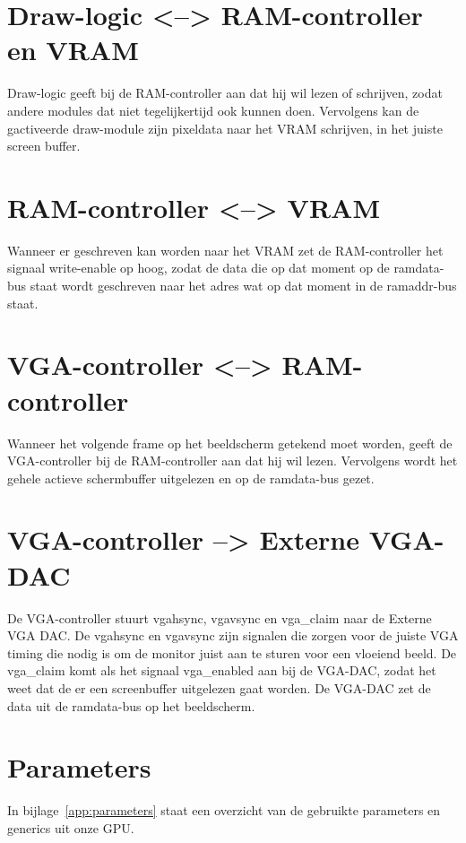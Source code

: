 \documentclass{scrartcl} %
\begin{document}
\section {Draw-logic <--> RAM-controller en VRAM}
Draw-logic geeft bij de RAM-controller aan dat hij wil lezen of schrijven, zodat andere modules dat niet tegelijkertijd ook kunnen doen. Vervolgens kan de gactiveerde draw-module zijn pixeldata naar het VRAM schrijven, in het juiste screen buffer.

\section{RAM-controller <--> VRAM}
Wanneer er geschreven kan worden naar het VRAM zet de RAM-controller het signaal write-enable op hoog, zodat de data die op dat moment op de ramdata-bus staat wordt geschreven naar het adres wat op dat moment in de ramaddr-bus staat.

\section{VGA-controller <--> RAM-controller}
Wanneer het volgende frame op het beeldscherm getekend moet worden, geeft de VGA-controller bij de RAM-controller aan dat hij wil lezen. Vervolgens wordt het gehele actieve schermbuffer uitgelezen en op de ramdata-bus gezet.

\section{VGA-controller --> Externe VGA-DAC}
De VGA-controller stuurt vgahsync, vgavsync en vga\_claim naar de Externe VGA DAC. De vgahsync en vgavsync zijn signalen die zorgen voor de juiste VGA timing die nodig is om de monitor juist aan te sturen voor een vloeiend beeld. De vga\_claim komt als het signaal vga\_enabled aan bij de VGA-DAC, zodat het weet dat de er een screenbuffer uitgelezen gaat worden. De VGA-DAC zet de data uit de ramdata-bus op het beeldscherm.

\section{Parameters} 
In bijlage~\ref{app:parameters} staat een overzicht van de gebruikte parameters en generics uit onze GPU.
\end{document}
